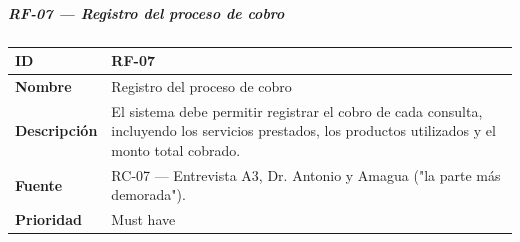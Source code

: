 \documentclass[
]{article}
\newcounter{none} %
\begin{document}
\subparagraph{RF-07 --- Registro del proceso de
cobro}\label{rf-07-registro-del-proceso-de-cobro}

{\def\LTcaptype{none} %
\begin{longtable}[]{@{}
  >{\raggedright\arraybackslash}p{}
  >{\raggedright\arraybackslash}p{}@{}}
\toprule\noalign{}
\begin{minipage}[b]{\linewidth}\raggedright
\textbf{ID}
\end{minipage} & \begin{minipage}[b]{\linewidth}\raggedright
RF-07
\end{minipage} \\
\midrule\noalign{}
\endhead
\bottomrule\noalign{}
\endlastfoot
\textbf{Nombre} & \begin{minipage}[t]{\linewidth}\raggedright
Registro del proceso de cobro
\end{minipage} \\
\textbf{Descripción} & \begin{minipage}[t]{\linewidth}\raggedright
El sistema debe permitir registrar el cobro de cada consulta, incluyendo
los servicios prestados, los productos utilizados y el monto total
cobrado.
\end{minipage} \\
\textbf{Fuente} & \begin{minipage}[t]{\linewidth}\raggedright
RC-07 --- Entrevista A3, Dr. Antonio y Amagua ("la parte más demorada").
\end{minipage} \\
\textbf{Prioridad} & \begin{minipage}[t]{\linewidth}\raggedright
Must have
\end{minipage} \\
\end{longtable}
}
\end{document}
